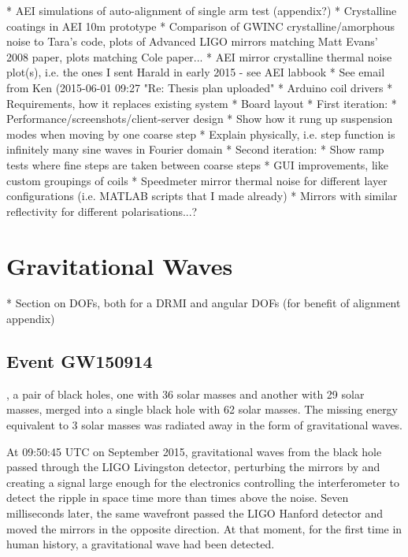 * AEI simulations of auto-alignment of single arm test (appendix?)
* Crystalline coatings in AEI 10m prototype
  * Comparison of GWINC crystalline/amorphous noise to Tara's code, plots of Advanced LIGO mirrors matching Matt Evans' 2008 paper, plots matching Cole paper...
  * AEI mirror crystalline thermal noise plot(s), i.e. the ones I sent Harald in early 2015 - see AEI labbook
  * See email from Ken (2015-06-01 09:27 "Re: Thesis plan uploaded"
* Arduino coil drivers
  * Requirements, how it replaces existing system
  * Board layout
  * First iteration:
    * Performance/screenshots/client-server design
    * Show how it rung up suspension modes when moving by one coarse step
      * Explain physically, i.e. step function is infinitely many sine waves in Fourier domain
  * Second iteration:
    * Show ramp tests where fine steps are taken between coarse steps
    * GUI improvements, like custom groupings of coils
* Speedmeter mirror thermal noise for different layer configurations (i.e. MATLAB scripts that I made already)
* Mirrors with similar reflectivity for different polarisations...?

\chapter{Gravitational Waves}
\label{c:gw-detection}

* Section on DOFs, both for a DRMI and angular DOFs (for benefit of alignment appendix)

\section{Event GW150914}
, a pair of black holes, one with 36 solar masses and another with 29 solar masses, merged into a single black hole with 62 solar masses. The missing energy equivalent to 3 solar masses was radiated away in the form of gravitational waves.

At 09:50:45 \gls{UTC} on  September 2015, gravitational waves from the black hole passed through the LIGO Livingston detector, perturbing the mirrors by  and creating a signal large enough for the electronics controlling the interferometer to detect the ripple in space time more than  times above the noise. Seven milliseconds later, the same wavefront passed the LIGO Hanford detector and moved the mirrors in the opposite direction. At that moment, for the first time in human history, a gravitational wave had been detected.

